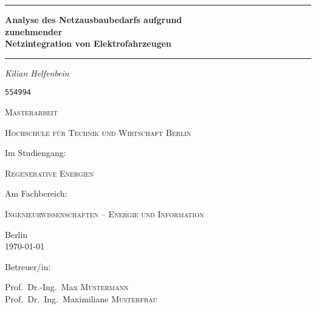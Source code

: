 
\begin{titlepage}
	\centering
	\par\noindent\rule{\textwidth}{0.4pt}
	{\huge\bfseries Analyse des Netzausbaubedarfs aufgrund\\
	zunehmender\\
	Netzintegration von Elektrofahrzeugen\par}
	\par\noindent\rule{\textwidth}{0.4pt}\par
	\vspace*{2cm}
	{\Large\itshape Kilian Helfenbein\par}
	{\Large \texttt{554994}\par}
	\vspace{1.5cm}
	{\scshape\Large Masterarbeit\par}
	\vspace{1.5cm}
	{\scshape\LARGE Hochschule für Technik und Wirtschaft Berlin \par}
	\vspace{1cm}
	Im Studiengang:\par
	{\scshape\large Regenerative Energien\par}
	\vspace{.5cm}
	Am Fachbereich:\par
	{\scshape\large Ingenieurwissenschaften {--} Energie und Information\par}
	\vfill
	{\large Berlin\\
	\today\par}
	\vfill
	Betreuer/in:\par
	Prof.~Dr.-Ing.~Max \textsc{Mustermann}\\
	Prof.~Dr.~Ing.~Maximiliane \textsc{Musterfrau}
\end{titlepage}